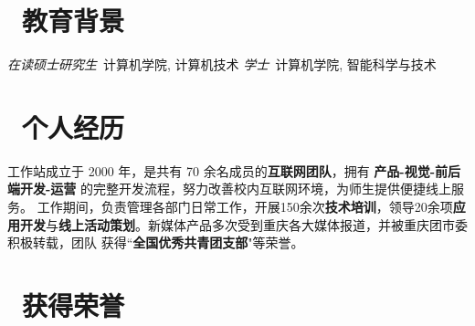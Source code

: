 \documentclass{resume}
\begin{document}



\section{\faGraduationCap\  教育背景}
  \textit{在读硕士研究生}\ 计算机学院, 计算机技术
  \textit{学士}\ 计算机学院, 智能科学与技术

\section{\faCogs\ 个人经历}


  \begin{onehalfspacing}
    工作站成立于 2000 年，是共有 70 余名成员的\textbf{互联网团队}，拥有 \textbf{产品-视觉-前后端开发-运营} 的完整开发流程，努力改善校内互联网环境，为师生提供便捷线上服务。
    工作期间，负责管理各部门日常工作，开展150余次\textbf{技术培训}，领导20余项\textbf{应用开发}与\textbf{线上活动策划}。新媒体产品多次受到重庆各大媒体报道，并被重庆团市委积极转载，团队
    获得``\textbf{全国优秀共青团支部}"等荣誉。
  \end{onehalfspacing}

\section{\faHeartO\ 获得荣誉}
\end{document}
